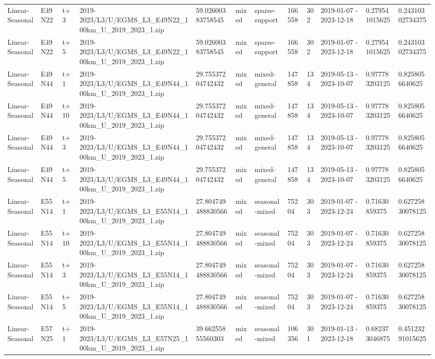 \begin{landscape}
\begin{longtable}{llllllllllll}
Linear-Seasonal & E49N22 & t+3 & 2019-2023/L3/U/EGMS\_L3\_E49N22\_100km\_U\_2019\_2023\_1.zip & 59.02600383758545 & mixed & sparse-support & 166558 & 302 & 2019-01-07 - 2023-12-18 & 0.279541015625 & 0.24310302734375 \\
Linear-Seasonal & E49N22 & t+5 & 2019-2023/L3/U/EGMS\_L3\_E49N22\_100km\_U\_2019\_2023\_1.zip & 59.02600383758545 & mixed & sparse-support & 166558 & 302 & 2019-01-07 - 2023-12-18 & 0.279541015625 & 0.24310302734375 \\
Linear-Seasonal & E49N44 & t+1 & 2019-2023/L3/U/EGMS\_L3\_E49N44\_100km\_U\_2019\_2023\_1.zip & 29.75537204742432 & mixed & mixed-general & 147858 & 134 & 2019-05-13 - 2023-10-07 & 0.977783203125 & 0.8258056640625 \\
Linear-Seasonal & E49N44 & t+10 & 2019-2023/L3/U/EGMS\_L3\_E49N44\_100km\_U\_2019\_2023\_1.zip & 29.75537204742432 & mixed & mixed-general & 147858 & 134 & 2019-05-13 - 2023-10-07 & 0.977783203125 & 0.8258056640625 \\
Linear-Seasonal & E49N44 & t+3 & 2019-2023/L3/U/EGMS\_L3\_E49N44\_100km\_U\_2019\_2023\_1.zip & 29.75537204742432 & mixed & mixed-general & 147858 & 134 & 2019-05-13 - 2023-10-07 & 0.977783203125 & 0.8258056640625 \\
Linear-Seasonal & E49N44 & t+5 & 2019-2023/L3/U/EGMS\_L3\_E49N44\_100km\_U\_2019\_2023\_1.zip & 29.75537204742432 & mixed & mixed-general & 147858 & 134 & 2019-05-13 - 2023-10-07 & 0.977783203125 & 0.8258056640625 \\
Linear-Seasonal & E55N14 & t+1 & 2019-2023/L3/U/EGMS\_L3\_E55N14\_100km\_U\_2019\_2023\_1.zip & 27.804749488830566 & mixed & seasonal-mixed & 75204 & 303 & 2019-01-07 - 2023-12-24 & 0.71630859375 & 0.62725830078125 \\
Linear-Seasonal & E55N14 & t+10 & 2019-2023/L3/U/EGMS\_L3\_E55N14\_100km\_U\_2019\_2023\_1.zip & 27.804749488830566 & mixed & seasonal-mixed & 75204 & 303 & 2019-01-07 - 2023-12-24 & 0.71630859375 & 0.62725830078125 \\
Linear-Seasonal & E55N14 & t+3 & 2019-2023/L3/U/EGMS\_L3\_E55N14\_100km\_U\_2019\_2023\_1.zip & 27.804749488830566 & mixed & seasonal-mixed & 75204 & 303 & 2019-01-07 - 2023-12-24 & 0.71630859375 & 0.62725830078125 \\
Linear-Seasonal & E55N14 & t+5 & 2019-2023/L3/U/EGMS\_L3\_E55N14\_100km\_U\_2019\_2023\_1.zip & 27.804749488830566 & mixed & seasonal-mixed & 75204 & 303 & 2019-01-07 - 2023-12-24 & 0.71630859375 & 0.62725830078125 \\
Linear-Seasonal & E57N25 & t+1 & 2019-2023/L3/U/EGMS\_L3\_E57N25\_100km\_U\_2019\_2023\_1.zip & 39.66255855560303 & mixed & seasonal-mixed & 106356 & 301 & 2019-01-13 - 2023-12-18 & 0.682373046875 & 0.45123291015625 \\

\end{longtable}
\end{landscape}
